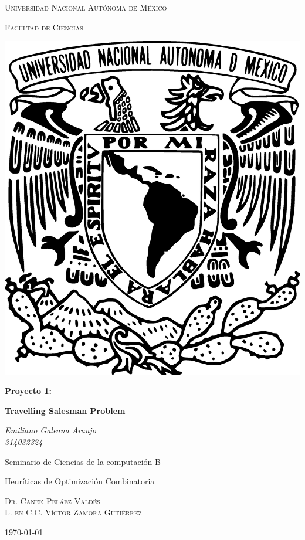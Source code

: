 \documentclass[
10pt,
a4paper,
oneside,
headinclude,footinclude,
BCOR5mm,
]{article}
\begin{document}
\begin{titlepage}
  \centering
  {\scshape\LARGE Universidad Nacional Autónoma de México \par}
      \vspace{1cm}
	     {\scshape\Large Facultad de Ciencias\par}
	     \vspace{1.2cm}
             \begin{center}
	       \includegraphics[scale=.2]{../imagenes/UNAM.eps}
	     \end{center}
	     \vspace{.5 cm}

	     {\huge\bfseries Proyecto 1: \par}
	     {\huge\bfseries Travelling Salesman Problem \par}
	     \vspace{0.5cm}

	     {\Large\itshape Emiliano Galeana Araujo\\314032324\par}
	     \vfill
	     \vspace{0.5cm}

             Seminario de Ciencias de la computación B\par
             Heuríticas de Optimización Combinatoria\par\par
	     \textsc{Dr. Canek Peláez Valdés}\\
             \textsc{L. en C.C. Víctor Zamora Gutiérrez}\\
	     \vspace{0.1cm}
	            {\large \today \par}
\end{titlepage}
\end{document}
